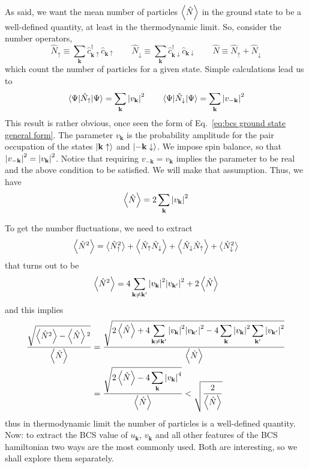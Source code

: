 As said, we want the mean number of particles $\ev{\hat{N}}$ in the ground state to be a well-defined quantity, at least in the thermodynamic limit. So, consider the number operators,
\[
	\hat{N}_\uparrow \equiv \sum_{\mathbf{k}}
		\hat{c}_{\mathbf{k}\uparrow}^\dagger \hat{c}_{\mathbf{k}\uparrow}
	\qquad
	\hat{N}_\downarrow \equiv \sum_{\mathbf{k}}
		\hat{c}_{\mathbf{k}\downarrow}^\dagger \hat{c}_{\mathbf{k}\downarrow}
	\qquad
	\hat{N} \equiv \hat{N}_\uparrow + \hat{N}_\downarrow
\]
which count the number of particles for a given state. Simple calculations lead us to
\[
	\mel{\Psi}{\hat{N}_\uparrow}{\Psi} = \sum_{\mathbf{k}} \abs{v_\mathbf{k}}^2
	\qquad
	\mel{\Psi}{\hat{N}_\downarrow}{\Psi} = \sum_{\mathbf{k}} \abs{v_{-\mathbf{k}}}^2
\]
This result is rather obvious, once seen the form of Eq.~\eqref{eq:bcs ground state general form}. The parameter $v_\mathbf{k}$ is the probability amplitude for the pair occupation of the states $\ket{\mathbf{k}\uparrow}$ and $\ket{-\mathbf{k}\downarrow}$.
We impose spin balance, so that $\abs{v_{-\mathbf{k}}}^2 = \abs{v_\mathbf{k}}^2$. Notice that requiring $v_{-\mathbf{k}} = v_\mathbf{k}$ implies the parameter to be real and the above condition to be satisfied. We will make that assumption. Thus, we have
\[
	\ev{\hat{N}} = 2\sum_{\mathbf{k}} \abs{v_\mathbf{k}}^2
\]

To get the number fluctuations, we need to extract
\[
	\ev{\hat{N}^2} = \big\langle \hat{N}_\uparrow^2 \big\rangle + \ev{\hat{N}_\uparrow \hat{N}_\downarrow} + \ev{\hat{N}_\downarrow \hat{N}_\uparrow} + \big\langle \hat{N}_\downarrow^2 \big\rangle
\]
that turns out to be
\[
	\ev{\hat{N}^2} = 4 \sum_{\mathbf{k} \neq \mathbf{k}'} \abs{v_\mathbf{k}}^2 \abs{v_{\mathbf{k}'}}^2 + 2 \ev{\hat{N}}
\]
and this implies
\[
\begin{aligned}
	\frac{\sqrt{\ev{\hat{N}^2} - \ev{\hat{N}} \vphantom{\hat{N}}^2}}{\ev{\hat{N}}} &= \frac{\displaystyle
		\sqrt{2\ev{\hat{N}} + 4\sum_{\mathbf{k}\neq\mathbf{k}'} \abs{v_\mathbf{k}}^2 \abs{v_{\mathbf{k}'}}^2 - 4\sum_{\mathbf{k}} \abs{v_\mathbf{k}}^2 \sum_{\mathbf{k}'} \abs{v_{\mathbf{k}'}}^2}
	}{ \ev{\hat{N}}	} \\
	&= \frac{\displaystyle
		\sqrt{2\ev{\hat{N}} - 4\sum_\mathbf{k} \abs{v_\mathbf{k}}^4}
	}{ \ev{\hat{N}}	} < \sqrt{\frac{2}{\ev{\hat{N}}}}
\end{aligned}
\]
thus in thermodynamic limit the number of particles is a well-defined quantity.
Now: to extract the BCS value of $u_\mathbf{k}$, $v_\mathbf{k}$ and all other features of the BCS hamiltonian two ways are the most commonly used. Both are interesting, so we shall explore them separately.

